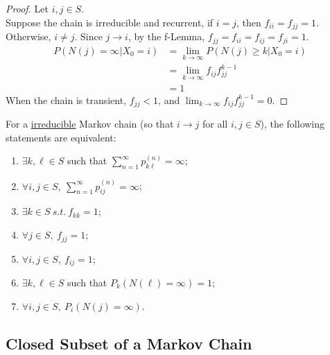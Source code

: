 \documentclass{article}
\newcommand{\upn}[0]{^{(n)}}
\begin{document}
    \begin{proof}
    	Let $i, j \in S$. \\
    	Suppose the chain is irreducible and recurrent, if $i = j$, then $f_{ii} = f_{jj} = 1$. \\
    	Otherwise, $i \neq j$. Since $j \to i$, by the f-Lemma, $f_{jj} = f_{ii} = f_{ij} = f_{ji} = 1$.
    	\begin{align}
    		P(N(j) = \infty | X_0 = i)
    		&= \lim_{k \to \infty} P(N(j) \geq k | X_0 = i) \\
    		&= \lim_{k \to \infty} f_{ij} f_{jj}^{k-1} \\
    		&= 1
    	\end{align}
    	When the chain is transient, $f_{jj} < 1$, and $\lim_{k \to \infty} f_{ij} f_{jj}^{k-1} = 0$.
    \end{proof}
    
    \begin{theorem}
    	For a \ul{irreducible} Markov chain (so that $i \to j$ for all $i, j \in S$), the following statements are equivalent:
    	\begin{enumerate}[(1)]
    		\item $\exists k, \ell \in S$ such that $\sum_{n=1}^\infty p_{k \ell}\upn = \infty$;
    		\item $\forall i,j \in S,\ \sum_{n=1}^\infty p_{ij}\upn = \infty$;
    		\item $\exists k \in S\ s.t.\ f_{kk} = 1$;
    		\item $\forall j \in S,\ f_{jj} = 1$;
    		\item $\forall i,j \in S,\ f_{ij} = 1$;
    		\item $\exists k, \ell \in S$ such that $P_k(N(\ell) = \infty) = 1$;
    		\item $\forall i, j \in S,\ P_i(N(j) = \infty)$.
    	\end{enumerate}
    \end{theorem}
    
    \subsection{Closed Subset of a Markov Chain}
\end{document}

